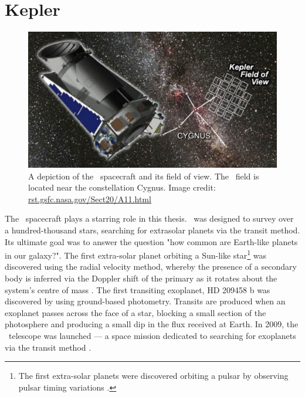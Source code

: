 \section{Kepler}
\label{sec:kepler}

\begin{figure}[p]
\begin{center}
\includegraphics[width=6in, clip=true]{figures/kepler_pic.pdf}
\caption[The \kepler\ spacecraft and its field of view.]
{A depiction of the \kepler\ spacecraft and its field of view.
The \kepler\ field is located near the constellation Cygnus.
Image credit: \url{rst.gsfc.nasa.gov/Sect20/A11.html}}
\label{fig:current_fields}
\end{center}
\end{figure}

The \kepler\ spacecraft plays a starring role in this thesis.
\kepler\ was designed to survey over a hundred-thousand stars, searching for
extrasolar planets via the transit method.
Its ultimate goal was to answer the question "how common are Earth-like
planets in our galaxy?".
The first extra-solar planet orbiting a Sun-like star\footnote{The first
extra-solar planets were discovered orbiting a pulsar by observing pulsar
timing variations \citep{Wolszczan1992}.}
was discovered using the radial velocity method, whereby the presence of a
secondary body is inferred via the Doppler shift of the primary as it rotates
about the system's centre of mass \citep{Mayor1995}.
The first transiting exoplanet, HD 209458 b was discovered by
\citet{Charbonneau2000} using ground-based photometry.
Transits are produced when an exoplanet passes across the face of a star,
blocking a small section of the photosphere and producing a small dip in the
flux received at Earth.
In 2009, the \kepler\ telescope was launched --- a space mission dedicated to
searching for exoplanets via the transit method \citep{Borucki2010}.

